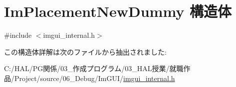 \hypertarget{struct_im_placement_new_dummy}{}\section{Im\+Placement\+New\+Dummy 構造体}
\label{struct_im_placement_new_dummy}


{\ttfamily \#include $<$imgui\+\_\+internal.\+h$>$}



この構造体詳解は次のファイルから抽出されました\+:\begin{DoxyCompactItemize}
\item 
C\+:/\+H\+A\+L/\+P\+G関係/03\+\_\+作成プログラム/03\+\_\+\+H\+A\+L授業/就職作品/\+Project/source/06\+\_\+\+Debug/\+Im\+G\+U\+I/\mbox{\hyperlink{imgui__internal_8h}{imgui\+\_\+internal.\+h}}\end{DoxyCompactItemize}
